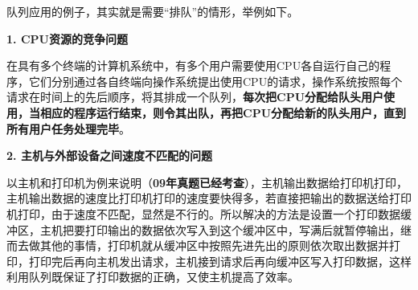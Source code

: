 队列应用的例子，其实就是需要``排队''的情形，{举例如下。}

\textbf{{1. CPU资源的竞争问题}}

{在具有多个终端的计算机系统中，有多个用户需要使用CPU各自运行自己的程}{序，它们分别通过各自终端向操作系统提出使用CPU的请求，操作系统按照每个}{请求在时间上的先后顺序，将其排成一个队列，\textbf{{每次把CPU分配给队头用户使}}}{\textbf{用，当相应的程序运行结束，则令其出队，再把CPU分配给新的队头用户，直到}}{\textbf{{所有用户任务处理完毕}}{。}}

\textbf{{2. 主机与外部设备之间速度不匹配的问题}}

以主机和打印机为例来说明（\textbf{{09年真题已经考查}}），主机输出数据给打印机打{印，主机输出数据的速度}{比打印机打印的速度要快得多，若直接把输出的数据送}{给打印机打印，由于速度}{不匹配，显然是不行的。所以解决的方法是设置一个打}{印数据缓冲区，主机把要}{打印输出的数据依次写入到这个缓冲区中，写满后就暂}{停输出，继而去做其他的}{事情，打印机就从缓冲区中按照先进先出的原则依次取}{出数据并打印，打印完后}{再向主机发出请求，主机接到请求后再向缓冲区写入打}{印数据，这样利用队列既}{保证了打印数据的正确，又使主机提高了效率。}
